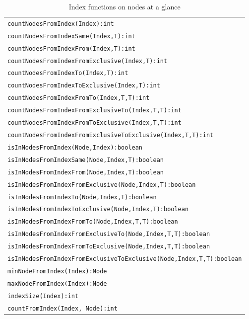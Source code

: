 \begin{table}[htbp]
\centering
\begin{tabular}{|l|}
\hline
\texttt{countNodesFromIndex(Index):int}\\
\texttt{countNodesFromIndexSame(Index,T):int}\\
\texttt{countNodesFromIndexFrom(Index,T):int}\\
\texttt{countNodesFromIndexFromExclusive(Index,T):int}\\
\texttt{countNodesFromIndexTo(Index,T):int}\\
\texttt{countNodesFromIndexToExclusive(Index,T):int}\\
\texttt{countNodesFromIndexFromTo(Index,T,T):int}\\
\texttt{countNodesFromIndexFromExclusiveTo(Index,T,T):int}\\
\texttt{countNodesFromIndexFromToExclusive(Index,T,T):int}\\
\texttt{countNodesFromIndexFromExclusiveToExclusive(Index,T,T):int}\\
\hline
\texttt{isInNodesFromIndex(Node,Index):boolean}\\
\texttt{isInNodesFromIndexSame(Node,Index,T):boolean}\\
\texttt{isInNodesFromIndexFrom(Node,Index,T):boolean}\\
\texttt{isInNodesFromIndexFromExclusive(Node,Index,T):boolean}\\
\texttt{isInNodesFromIndexTo(Node,Index,T):boolean}\\
\texttt{isInNodesFromIndexToExclusive(Node,Index,T):boolean}\\
\texttt{isInNodesFromIndexFromTo(Node,Index,T,T):boolean}\\
\texttt{isInNodesFromIndexFromExclusiveTo(Node,Index,T,T):boolean}\\
\texttt{isInNodesFromIndexFromToExclusive(Node,Index,T,T):boolean}\\
\texttt{isInNodesFromIndexFromExclusiveToExclusive(Node,Index,T,T):boolean}\\
\hline
\texttt{minNodeFromIndex(Index):Node}\\
\texttt{maxNodeFromIndex(Index):Node}\\
\hline
\texttt{indexSize(Index):int}\\
\hline
\texttt{countFromIndex(Index, Node):int}\\
\hline
\end{tabular}
\caption{Index functions on nodes at a glance}
\label{indexnodestab}
\end{table}

